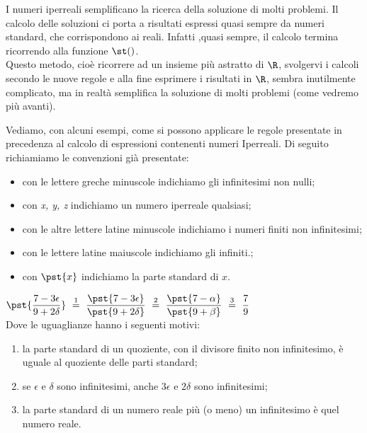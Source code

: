 I numeri iperreali semplificano la ricerca della soluzione di molti problemi.
Il calcolo delle soluzioni ci porta a risultati espressi quasi sempre da 
numeri 
standard, che corrispondono ai reali. Infatti ,quasi sempre, il calcolo 
termina ricorrendo alla funzione $\st()$.\\
Questo metodo, cioè ricorrere ad un insieme più astratto di \(\R\), svolgervi 
i calcoli secondo le nuove regole e alla fine esprimere i risultati in \(\R\), 
sembra inutilmente complicato, 
ma in realtà semplifica la soluzione di molti problemi 
(come vedremo più avanti).

Vediamo, con alcuni esempi, come si possono applicare 
le regole presentate in precedenza al calcolo di espressioni 
contenenti numeri Iperreali. 
Di seguito richiamiamo le convenzioni già presentate:
\begin{itemize} [nosep]
 \item con le lettere greche minuscole indichiamo gli infinitesimi non nulli;
 \item con \emph{x, y, z} indichiamo un numero iperreale qualsiasi;
 \item con le altre lettere latine minuscole indichiamo i numeri finiti non 
infinitesimi;
 \item con le lettere latine maiuscole indichiamo gli infiniti.;
 \item con \(\pst{x}\) indichiamo la parte standard di \(x\).
\end{itemize}

\begin{esempio}

\(\pst{\dfrac{7 -3 \epsilon}{9 +2 \delta}} 
~ \stackrel{1}{=} ~
  \dfrac{\pst{7 -3 \epsilon}}{\pst{9 +2 \delta}} 
~ \stackrel{2}{=} ~
  \dfrac{\pst{7 -\alpha}}{\pst{9 +\beta}} 
~ \stackrel{3}{=} ~
  \dfrac{7}{9}\)\\

Dove le uguaglianze hanno i seguenti motivi:
\begin{enumerate} [nosep]
 \item la parte standard di un quoziente, con il divisore finito non 
infinitesimo, è uguale al quoziente delle parti standard; 
 \item se \(\epsilon \text{ e } \delta\) sono infinitesimi, 
 anche \(3\epsilon\) e \(2 \delta\) sono infinitesimi;
 \item la parte standard di un numero reale più (o meno) un infinitesimo è 
quel 
numero reale.
\end{enumerate}
\end{esempio}

